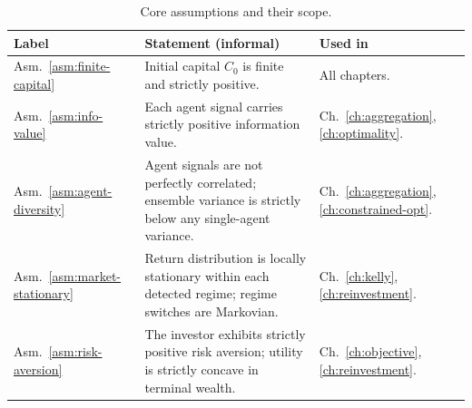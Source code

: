 \documentclass[12pt,openany]{book}
\numberwithin{equation}{chapter}
\theoremstyle{plain}
\theoremstyle{definition}
\theoremstyle{remark}
\numberwithin{equation}{chapter}
\theoremstyle{plain}
\begin{document}
\begin{table}[H]
\centering
\caption{Core assumptions and their scope.}
\label{tab:assumptions-summary}
\small
\begin{tabularx}{\linewidth}{@{} l X X @{}}
\toprule
\textbf{Label} & \textbf{Statement (informal)} & \textbf{Used in} \\
\midrule
Asm.~\ref{asm:finite-capital}
  & Initial capital $C_0$ is finite and strictly positive.
  & All chapters. \\[3pt]
Asm.~\ref{asm:info-value}
  & Each agent signal carries strictly positive information value.
  & Ch.~\ref{ch:aggregation}, \ref{ch:optimality}. \\[3pt]
Asm.~\ref{asm:agent-diversity}
  & Agent signals are not perfectly correlated; ensemble variance
    is strictly below any single-agent variance.
  & Ch.~\ref{ch:aggregation}, \ref{ch:constrained-opt}. \\[3pt]
Asm.~\ref{asm:market-stationary}
  & Return distribution is locally stationary within each
    detected regime; regime switches are Markovian.
  & Ch.~\ref{ch:kelly}, \ref{ch:reinvestment}. \\[3pt]
Asm.~\ref{asm:risk-aversion}
  & The investor exhibits strictly positive risk aversion;
    utility is strictly concave in terminal wealth.
  & Ch.~\ref{ch:objective}, \ref{ch:reinvestment}. \\
\bottomrule
\end{tabularx}
\end{table}
\end{document}
